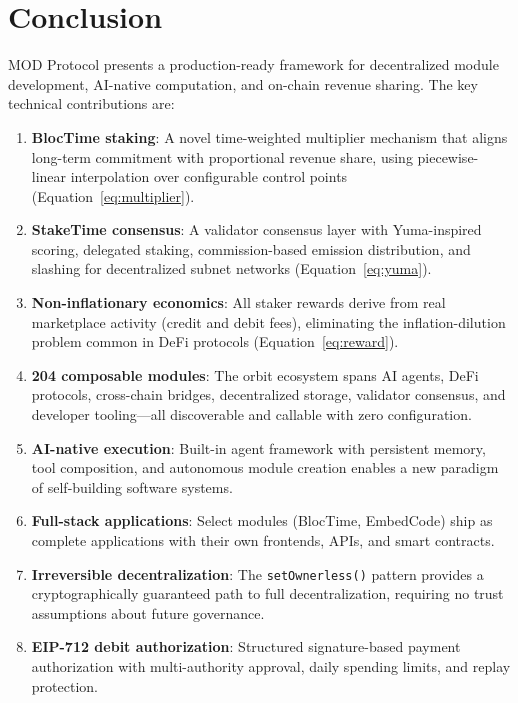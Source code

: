 \documentclass[11pt,a4paper]{article}
\begin{document}
\section{Conclusion}
\label{sec:conclusion}

MOD Protocol presents a production-ready framework for decentralized module development, AI-native computation, and on-chain revenue sharing. The key technical contributions are:

\begin{enumerate}
    \item \textbf{BlocTime staking}: A novel time-weighted multiplier mechanism that aligns long-term commitment with proportional revenue share, using piecewise-linear interpolation over configurable control points (Equation~\ref{eq:multiplier}).

    \item \textbf{StakeTime consensus}: A validator consensus layer with Yuma-inspired scoring, delegated staking, commission-based emission distribution, and slashing for decentralized subnet networks (Equation~\ref{eq:yuma}).

    \item \textbf{Non-inflationary economics}: All staker rewards derive from real marketplace activity (credit and debit fees), eliminating the inflation-dilution problem common in DeFi protocols (Equation~\ref{eq:reward}).

    \item \textbf{204 composable modules}: The orbit ecosystem spans AI agents, DeFi protocols, cross-chain bridges, decentralized storage, validator consensus, and developer tooling---all discoverable and callable with zero configuration.

    \item \textbf{AI-native execution}: Built-in agent framework with persistent memory, tool composition, and autonomous module creation enables a new paradigm of self-building software systems.

    \item \textbf{Full-stack applications}: Select modules (BlocTime, EmbedCode) ship as complete applications with their own frontends, APIs, and smart contracts.

    \item \textbf{Irreversible decentralization}: The \texttt{setOwnerless()} pattern provides a cryptographically guaranteed path to full decentralization, requiring no trust assumptions about future governance.

    \item \textbf{EIP-712 debit authorization}: Structured signature-based payment authorization with multi-authority approval, daily spending limits, and replay protection.
\end{enumerate}
\end{document}
